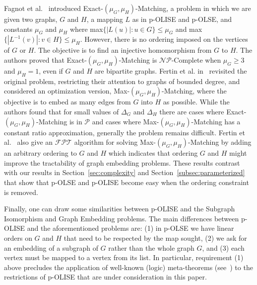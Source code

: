 \documentclass[11pt]{article}
\newcommand{\Pol}{\mbox{$\mathcal P$}}
\newcommand{\NP}{\mbox{$\mathcal{NP}$}}
\newcommand{\FPT}{\text{$\mathcal{FPT}$}}
\begin{document}
Fagnot et al.~\cite{Fagnot2008178} introduced {\textsc Exact-$(\mu_G, \mu_H)$-Matching}, a problem in which we are given two graphs, $G$ and $H$, a mapping $L$ as in p-OLISE and p-OLSE, and constants $\mu_G$ and $\mu_H$ where max$\{|L(u)|:u \in G\} \le \mu_G$ and max$\{|L^{-1}(v)|:v \in H\} \le \mu_H$. However,  there is no ordering imposed on the vertices of $G$ or $H$.  The objective is to find an injective homomorphism from $G$ to $H$. The authors proved that {\textsc Exact-$(\mu_G, \mu_H)$-Matching} is \NP-Complete when $\mu_G \ge 3$ and $\mu_H = 1$, even if $G$ and $H$ are bipartite graphs.  Fertin et al. in~\cite{Fertin2005,Fertin2009} revisited the original problem, restricting their attention to graphs of bounded degree, and considered an optimization version, {\textsc Max-$(\mu_G, \mu_H)$-Matching}, where the objective is to embed as many edges from $G$ into $H$ as possible. While the authors found that for small values of $\Delta_G$ and $\Delta_H$ there are cases where {\textsc Exact-$(\mu_G, \mu_H)$-Matching} is in $\Pol$ and cases where {\textsc Max-$(\mu_G, \mu_H)$-Matching} has a constant ratio approximation, generally the problem remains difficult. Fertin et al.~\cite{Fertin2005,Fertin2009} also give an $\FPT$ algorithm for solving {\textsc Max-$(\mu_G, \mu_H)$-Matching} by adding an arbitrary ordering to $G$ and $H$ which indicates that ordering $G$ and $H$ might improve the tractability of graph embedding problems. These results contrast with our results in Section~\ref{sec:complexity} and Section~\ref{subsec:parameterized} that show that p-OLSE and p-OLISE become easy when the ordering constraint is removed.

Finally, one can draw some similarities between p-OLISE and the {\sc Subgraph Isomorphism} and {\sc Graph Embedding} problems. The main differences between p-OLISE and the aforementioned problems are: (1) in p-OLSE we have linear orders on $G$ and $H$ that need to be respected by the map sought, (2) we ask for an embedding of a subgraph of $G$ rather than the whole graph $G$, and (3) each vertex must be mapped to a vertex from its list. In particular, requirement (1) above precludes the application of well-known (logic) meta-theorems (see~\cite{grohebook}) to the restrictions of p-OLISE that are under consideration in this paper.
\end{document}
